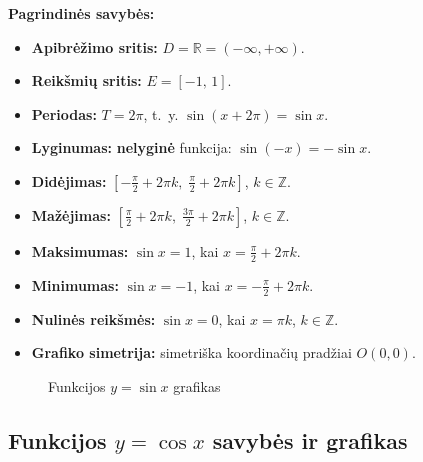 \textbf{Pagrindinės savybės:}
\begin{itemize}
    \item \textbf{Apibrėžimo sritis:} \(D = \mathbb{R} = (-\infty, +\infty)\).
    \item \textbf{Reikšmių sritis:} \(E = [-1,\, 1]\).
    \item \textbf{Periodas:} \(T = 2\pi\), t.~y. \(\sin(x + 2\pi) = \sin x\).
    \item \textbf{Lyginumas:} \textbf{nelyginė} funkcija: \(\sin(-x) = -\sin x\).
    \item \textbf{Didėjimas:} \(\left[-\frac{\pi}{2} + 2\pi k,\; \frac{\pi}{2} + 2\pi k\right]\), \(k \in \mathbb{Z}\).
    \item \textbf{Mažėjimas:} \(\left[\frac{\pi}{2} + 2\pi k,\; \frac{3\pi}{2} + 2\pi k\right]\), \(k \in \mathbb{Z}\).
    \item \textbf{Maksimumas:} \(\sin x = 1\), kai \(x = \frac{\pi}{2} + 2\pi k\).
    \item \textbf{Minimumas:} \(\sin x = -1\), kai \(x = -\frac{\pi}{2} + 2\pi k\).
    \item \textbf{Nulinės reikšmės:} \(\sin x = 0\), kai \(x = \pi k\), \(k \in \mathbb{Z}\).
    \item \textbf{Grafiko simetrija:} simetriška koordinačių pradžiai \(O(0,0)\).
\end{itemize}

\begin{figure}[h!]
\centering
\caption{Funkcijos \(y = \sin x\) grafikas}
\end{figure}

\subsection{Funkcijos \texorpdfstring{\(y = \cos x\)}{y = cos x} savybės ir grafikas}

